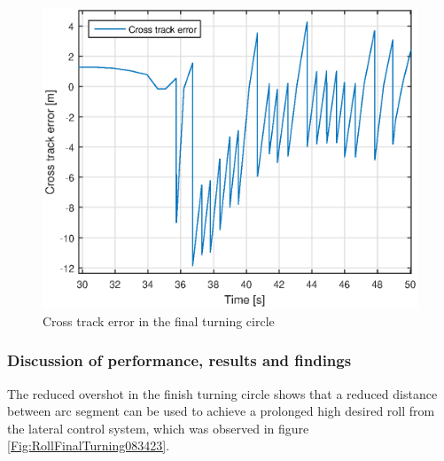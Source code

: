 \begin{figure}[H]
\centering
\includegraphics[scale=0.7]{figs/Experiment/CrossTrackError1juni083423.eps}
\caption{Cross track error in the final turning circle}
\label{Fig:CrossTrackError1juni083423}
\end{figure}
\subsubsection{Discussion of performance, results and findings}
The reduced overshot in the finish turning circle shows that a reduced distance between arc segment can be used to achieve a prolonged high desired roll from the lateral control system, which was observed in figure \ref{Fig:RollFinalTurning083423}.
